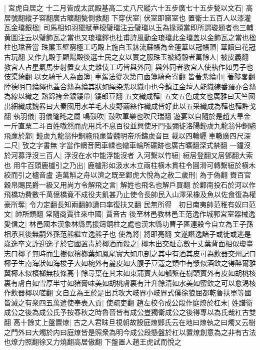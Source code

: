 |{
	宮虎自居之}
十二月皆成太武殿基高二丈八尺縱六十五步廣七十五步甃以文石|{
	高居號翻縱子容翻廣古曠翻甃側救翻}
下穿伏室|{
	伏室即窟室也}
置衛士五百人以漆灌瓦金璫銀楹|{
	司馬相如羽獵賦華榱璧璫注云璧璫以玉為掾頭當即所謂璇題者也三輔黄圖注云以璧飾瓦之當也又琅璫鐸也杜甫詩風動金琅璫此金璫盖以金飾瓦之當也楹柱也璫音當}
珠簾玉壁窮極工巧殿上施白玉牀流蘇帳為金蓮華以冠帳頂|{
	華讀曰花冠古玩翻}
又作九殿于顯陽殿後選士民之女以實之服珠玉被綺縠者萬餘人|{
	被皮義翻}
教宮人占星氣馬步射置女太史雜伎工巧皆與外同|{
	與外同者教宮人使執作如男子也伎渠綺翻}
以女騎千人為鹵簿|{
	車駕法從次第曰鹵簿騎奇寄翻}
皆著紫綸巾|{
	著陟畧翻陸德明曰綸繩也蓋合絲為綸其狀如䋲染紫以織巾也今鎮江金壇人能織線番羅亦合絲為線以織之}
熟錦袴金銀鏤帶|{
	鏤郎豆翻}
五文織成鞾|{
	五文五色成文也廣雅曰天竺國出細織成魏畧曰大秦國用水羊毛木皮野繭絲作織成皆好此以五采織成為鞾也鞾許戈翻}
執羽儀|{
	羽儀氅眊之屬}
鳴鼓吹|{
	鼔吹軍樂也吹尺瑞翻}
遊宴以自隨於是趙大旱金一斤直粟二斗百姓嗷然而虎用兵不息百役並興使牙門張彌徙洛陽鐘虡九龍翁仲銅駞飛亷於鄴|{
	鐘虡九龍翁仲銅駞飛亷皆魏明帝所鑄虡音巨}
載以四輪纒車轍廣四尺深二尺|{
	攷之字書無字當作輞音罔車輮也轍車輪所碾跡也廣古曠翻深式禁翻}
一鐘沒於河募浮沒三百人|{
	浮沒在水中能浮能沒者}
入河繫以竹絙|{
	絙居登翻又居鄧翻大索也}
用牛百頭鹿櫨引之乃出|{
	鹿櫨形如汲水木立兩柱横木貫柱令圓滑可轉繫絙於横木絞而引之櫨音盧}
造萬斛之舟以濟之既至鄴虎大悅為之赦二歲刑|{
	為于偽翻}
賚百官穀帛賜民爵一級又用尚方令解飛之言|{
	解姓也飛名也解戶買翻}
於鄴南投石於河以作飛橋功費數千萬億橋竟不成役夫飢甚乃止使令長帥民入山澤采橡及魚以佐食復為權豪所奪|{
	令力定翻長知兩翻帥讀曰率復扶又翻}
民無所得　初日南夷帥范稚有奴曰范文|{
	帥所類翻}
常隨商賈往來中國|{
	賈音古}
後至林邑教林邑王范逸作城郭宮室器械逸愛信之|{
	林邑國本漢象林縣馬援鑄銅柱之處也漢末縣功曹子區連殺今自立為王子孫相承其後無嗣外孫范熊繼立逸熊子也}
使為將|{
	將即亮翻}
文遂譖逸諸子或徙或逃是歲逸卒文詐迎逸子於它國置毒於椰酒而殺之|{
	椰木出交趾高數十丈葉背面相似瓊臺志曰椰子無時而生樹似檳榔葉如鳳尾實大如爪剖之其中有酒其皮可為飲器交州記曰椰子生南海狀如海梭子大如椀外有麄皮如大腹子豆蔻之類中有漿似酒飲之得醉爾雅翼椰木似檳榔無枝條高十餘尋葉在其末如束蒲實大如瓠繫在樹頭實外有皮如胡桃核裏有膚白如雪厚半寸如猪膏味美如胡桃膚裏有汁升餘清如水美如蜜飲之可以愈渴核作飲器椰以嗟翻}
文自立為王於是出兵攻大岐界小岐界式僕徐狼屈都乾魯扶單等國皆滅之有衆四五萬遣使奉表入貢|{
	使疏吏翻}
趙左校令成公段作庭燎於杠末|{
	姓譜衛成公之後為成公氏予按春秋之時魯晉皆有成公豈獨衛成公之後得專以為氏哉杠古雙翻}
高十餘丈上盤置燎|{
	古之人君昧旦視朝故設庭燎鄭氏云在地曰燎執之曰燭又云樹之門外曰大燭於内曰庭燎皆是照衆為明今成公段懸盤於杠以置燎創意為之非有古法也燎力照翻徐又力燒翻高居傲翻}
下盤置人趙王虎試而悅之

